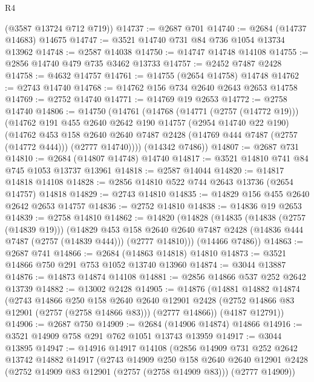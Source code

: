 \begin{lexlean}{R4}
\begin{coremodule}
      (@3587 @13724 @712 @719))
@14737 := @2687 @701
@14740 := @2684 (@14737 @14683) @14675
@14747 := @3521 @14740 @731 @84 @736 @1054 @13734 @13962
@14748 := @2587 @14038
@14750 := @14747 @14748 @14108
@14755 := @2856 @14740 @479 @735 @3462 @13733
@14757 := @2452 @7487 @2428
@14758 := @4632 @14757
@14761 := @14755 (@2654 @14758) @14748
@14762 := @2743 @14740
@14768 := @14762 @156 @734 @2640 @2643 @2653 @14758
@14769 := @2752 @14740
@14771 := @14769 @19 @2653
@14772 := @2758 @14740
@14806 := @14750
    (@14761
      (@14768
        (@14771 (@2757 (@14772 @19)))
        (@14762
          @191
          @455
          @2640
          @2642
          @190
          @14757
          (@2954 @14740 @22 @190)
          (@14762
            @453
            @158
            @2640
            @2640
            @7487
            @2428
            (@14769 @444 @7487 (@2757 (@14772 @444)))
            (@2777 @14740))))
      (@14342 @7486))
@14807 := @2687 @731
@14810 := @2684 (@14807 @14748) @14740
@14817 := @3521 @14810 @741 @84 @745 @1053 @13737 @13961
@14818 := @2587 @14044
@14820 := @14817 @14818 @14108
@14828 := @2856 @14810 @522 @744 @2643 @13736 (@2654 @14757) @14818
@14829 := @2743 @14810
@14835 := @14829 @156 @455 @2640 @2642 @2653 @14757
@14836 := @2752 @14810
@14838 := @14836 @19 @2653
@14839 := @2758 @14810
@14862 := @14820
    (@14828
      (@14835
        (@14838 (@2757 (@14839 @19)))
        (@14829
          @453
          @158
          @2640
          @2640
          @7487
          @2428
          (@14836 @444 @7487 (@2757 (@14839 @444)))
          (@2777 @14810)))
      (@14466 @7486))
@14863 := @2687 @741
@14866 := @2684 (@14863 @14818) @14810
@14873 := @3521 @14866 @750 @291 @753 @1052 @13740 @13960
@14874 := @3044 @13887
@14876 := @14873 @14874 @14108
@14881 := @2856 @14866 @537 @252 @2642 @13739
@14882 := @13002 @2428
@14905 := @14876
    (@14881
      @14882
      @14874
      (@2743
        @14866
        @250
        @158
        @2640
        @2640
        @12901
        @2428
        (@2752 @14866 @83 @12901 (@2757 (@2758 @14866 @83)))
        (@2777 @14866))
      (@4187 @12791))
@14906 := @2687 @750
@14909 := @2684 (@14906 @14874) @14866
@14916 := @3521 @14909 @758 @291 @762 @1051 @13743 @13959
@14917 := @3044 @13895
@14947 := @14916
    @14917
    @14108
    (@2856
      @14909
      @731
      @252
      @2642
      @13742
      @14882
      @14917
      (@2743
        @14909
        @250
        @158
        @2640
        @2640
        @12901
        @2428
        (@2752 @14909 @83 @12901 (@2757 (@2758 @14909 @83)))
        (@2777 @14909))

\end{coremodule}
\end{lexlean}
